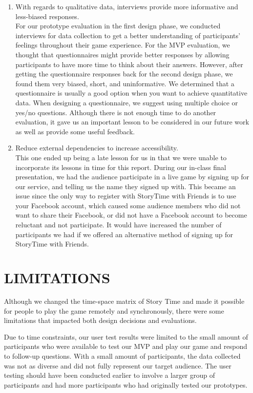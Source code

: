 \documentclass{sigchi}
\begin{document}
\begin{enumerate}
\item With regards to qualitative data, interviews provide more informative and less-biased responses.\\

For our prototype evaluation in the first design phase, we conducted interviews for data collection to get a better understanding of participants' feelings throughout their game experience. For the MVP evaluation, we thought that questionnaires might provide better responses by allowing participants to have more time to think about their answers. However, after getting the questionnaire responses back for the second design phase, we found them very biased, short, and uninformative. We determined that a questionnaire is usually a good option when you want to achieve quantitative data. When designing a questionnaire, we suggest using multiple choice or yes/no questions. Although there is not enough time to do another evaluation, it gave us an important lesson to be considered in our future work as well as provide some useful feedback.

\item Reduce external dependencies to increase accessibility.\\

This one ended up being a late lesson for us in that we were unable to incorporate its lessons in time for this report. During our in-class final presentation, we had the audience participate in a live game by signing up for our service, and telling us the name they signed up with. This became an issue since the only way to register with StoryTime with Friends is to use your Facebook account, which caused some audience members who did not want to share their Facebook, or did not have a Facebook account to become reluctant and not participate. It would have increased the number of participants we had if we offered an alternative method of signing up for StoryTime with Friends.

\end{enumerate}

\section{LIMITATIONS}
Although we changed the time-space matrix of Story Time and made it possible for people to play the game remotely and synchronously, there were some limitations that impacted both design decisions and evaluations. 

Due to time constraints, our user test results were limited to the small amount of participants who were available to test our MVP and play our game and respond to follow-up questions. With a small amount of participants, the data collected was not as diverse and did not fully represent our target audience. The user testing should have been conducted earlier to involve a larger group of participants and had more participants who had originally tested our prototypes. 
\end{document}
